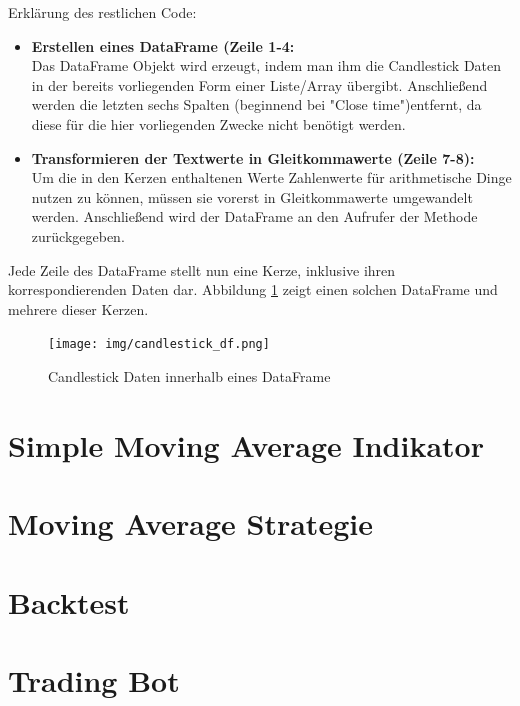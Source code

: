 \documentclass[oneside]{ausarbeitung}
\begin{document}
Erklärung des restlichen Code:
\begin{itemize}
	\item \textbf{Erstellen eines DataFrame (Zeile 1-4:} \\
		Das DataFrame Objekt wird erzeugt, indem man ihm die Candlestick Daten in
		der bereits vorliegenden Form einer Liste/Array übergibt. Anschließend
		werden die letzten sechs Spalten (beginnend bei "Close time")entfernt, da
		diese für die hier vorliegenden Zwecke nicht benötigt werden.
	\item \textbf{Transformieren der Textwerte in Gleitkommawerte (Zeile 7-8):} \\
		Um die in den Kerzen enthaltenen Werte Zahlenwerte für arithmetische
		Dinge nutzen zu können, müssen sie vorerst in Gleitkommawerte umgewandelt
		werden.	Anschließend wird der DataFrame an den Aufrufer der Methode
		zurückgegeben.	
\end{itemize}

Jede Zeile des DataFrame stellt nun eine Kerze, inklusive ihren korrespondierenden Daten dar. Abbildung \ref{fig:16} zeigt einen solchen DataFrame und mehrere dieser Kerzen.

\begin{figure}[H]
  \centering
  \texttt{[image: img/candlestick\_df.png]}
  \caption{Candlestick Daten innerhalb eines DataFrame}
  \label{fig:16}
\end{figure}


\section{Simple Moving Average Indikator}
\label{sec:simple_moving_average_indikator}


\section{Moving Average Strategie}
\label{sec:moving_average_strategie}


\section{Backtest}
\label{sec:backtest}


\section{Trading Bot}
\label{sec:trading_bot}
\end{document}
